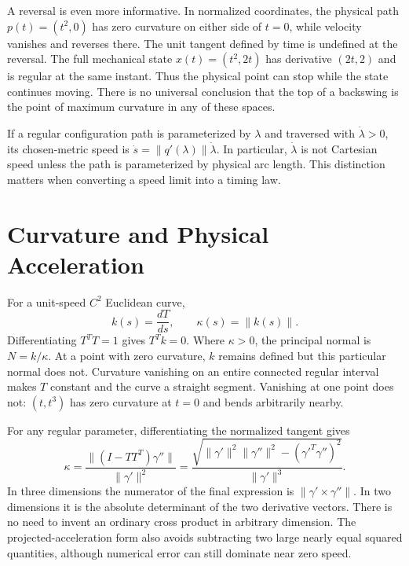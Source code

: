 A reversal is even more informative. In normalized coordinates, the physical path
$p(t)=(t^2,0)$ has zero curvature on either side of $t=0$, while velocity
vanishes and reverses there. The unit tangent defined by time is undefined
at the reversal. The full mechanical state
$x(t)=(t^2,2t)$ has derivative $(2t,2)$ and is regular at the same instant.
Thus the physical point can stop while the state continues moving. There is
no universal conclusion that the top of a backswing is the point of maximum
curvature in any of these spaces.

If a regular configuration path is parameterized by $\lambda$ and traversed
with $\dot\lambda>0$, its chosen-metric speed is
$\dot s=\|q'(\lambda)\|\dot\lambda$. In particular, $\dot\lambda$ is not
Cartesian speed unless the path is parameterized by physical arc length.
This distinction matters when converting a speed limit into a timing law.

\section{Curvature and Physical Acceleration}

For a unit-speed $C^2$ Euclidean curve,
\begin{equation}\label{eq:curvature_def}
 k(s)=\frac{dT}{ds},\qquad \kappa(s)=\|k(s)\|.
\end{equation}
Differentiating $T^TT=1$ gives $T^Tk=0$. Where $\kappa>0$, the principal
normal is $N=k/\kappa$. At a point with zero curvature, $k$ remains defined
but this particular normal does not. Curvature vanishing on an entire
connected regular interval makes $T$ constant and the curve a straight
segment. Vanishing at one point does not: $(t,t^3)$ has zero curvature at
$t=0$ and bends arbitrarily nearby.

For any regular parameter, differentiating the normalized tangent gives
\begin{equation}\label{eq:curvature_general_n}
 \kappa=\frac{\|(I-TT^T)\gamma''\|}{\|\gamma'\|^2}
 =\frac{\sqrt{\|\gamma'\|^2\|\gamma''\|^2-(\gamma'^T\gamma'')^2}}
 {\|\gamma'\|^3}.
\end{equation}
In three dimensions the numerator of the final expression is
$\|\gamma'\times\gamma''\|$. In two dimensions it is the absolute determinant
of the two derivative vectors. There is no need to invent an ordinary cross
product in arbitrary dimension. The projected-acceleration form also avoids
subtracting two large nearly equal squared quantities, although numerical
error can still dominate near zero speed.

